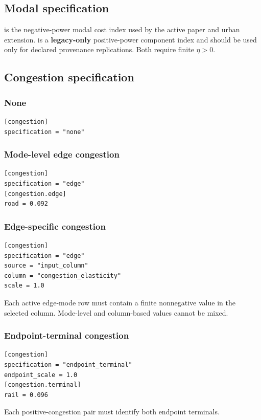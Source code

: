\subsection{Modal specification}

 is the negative-power modal cost index used by the active
paper and urban extension.  is a \textbf{legacy-only}
positive-power component index and should be used only for declared provenance
replications.
Both require finite \(\eta>0\).

\subsection{Congestion specification}

\subsubsection*{None}
\begin{lstlisting}
[congestion]
specification = "none"
\end{lstlisting}

\subsubsection*{Mode-level edge congestion}
\begin{lstlisting}
[congestion]
specification = "edge"
[congestion.edge]
road = 0.092
\end{lstlisting}

\subsubsection*{Edge-specific congestion}
\begin{lstlisting}
[congestion]
specification = "edge"
source = "input_column"
column = "congestion_elasticity"
scale = 1.0
\end{lstlisting}
Each active edge-mode row must contain a finite nonnegative value in the
selected column. Mode-level and column-based values cannot be mixed.

\subsubsection*{Endpoint-terminal congestion}
\begin{lstlisting}
[congestion]
specification = "endpoint_terminal"
endpoint_scale = 1.0
[congestion.terminal]
rail = 0.096
\end{lstlisting}
Each positive-congestion pair must identify both endpoint terminals.


